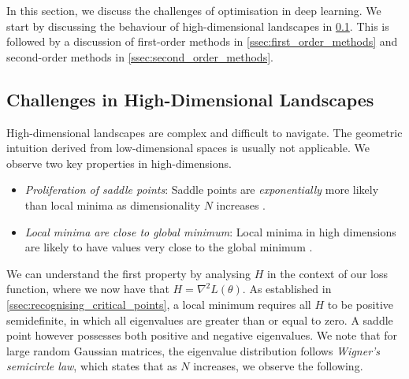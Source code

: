 In this section, we discuss the challenges of optimisation in deep learning. We start by discussing the behaviour of high-dimensional landscapes in \cref{ssec:dl_challenges}. This is followed by a discussion of first-order methods in \cref{ssec:first_order_methods} and second-order methods in \cref{ssec:second_order_methods}.



\subsection{Challenges in High-Dimensional Landscapes}

\label{ssec:dl_challenges}





High-dimensional landscapes are complex and difficult to navigate. The geometric intuition derived from low-dimensional spaces is usually not applicable. We observe two key properties in high-dimensions.

\begin{itemize}

    \item \textit{Proliferation of saddle points}: Saddle points are \textit{exponentially} more likely than local minima as dimensionality $N$ increases \citep{dauphin2014sfn}.

    \item \textit{Local minima are close to global minimum}: Local minima in high dimensions are likely to have values very close to the global minimum \citep{dauphin2014sfn,choromanska2015loss}.

\end{itemize}




We can understand the first property by analysing $H$ in the context of our loss function, where we now have that $H = \nabla^2 L(\theta)$. As established in \cref{ssec:recognising_critical_points}, a local minimum requires all $H$ to be positive semidefinite, in which all eigenvalues are greater than or equal to zero. A saddle point however possesses both positive and negative eigenvalues. We note that for large random Gaussian matrices, the eigenvalue distribution follows \textit{Wigner's semicircle law}, which states that as $N$ increases, we observe the following.

